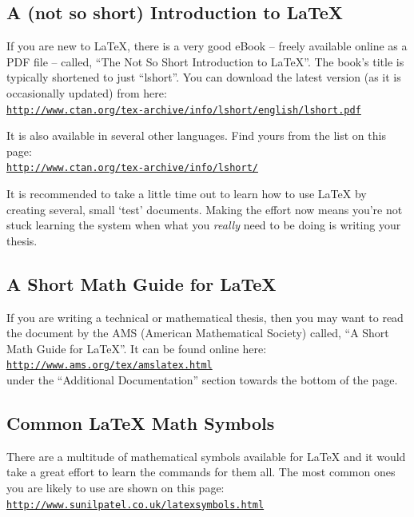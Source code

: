 \subsection{A (not so short) Introduction to \LaTeX{}}

If you are new to \LaTeX{}, there is a very good eBook -- freely available online as a PDF file -- called, ``The Not So Short Introduction to \LaTeX{}''. The book's title is typically shortened to just ``lshort''. You can download the latest version (as it is occasionally updated) from here:\\
\href{http://www.ctan.org/tex-archive/info/lshort/english/lshort.pdf}{\texttt{http://www.ctan.org/tex-archive/info/lshort/english/lshort.pdf}}

It is also available in several other languages. Find yours from the list on this page:\\
\href{http://www.ctan.org/tex-archive/info/lshort/}{\texttt{http://www.ctan.org/tex-archive/info/lshort/}}

It is recommended to take a little time out to learn how to use \LaTeX{} by creating several, small `test' documents. Making the effort now means you're not stuck learning the system when what you \emph{really} need to be doing is writing your thesis.

\subsection{A Short Math Guide for \LaTeX{}}

If you are writing a technical or mathematical thesis, then you may want to read the document by the AMS (American Mathematical Society) called, ``A Short Math Guide for \LaTeX{}''. It can be found online here:\\
\href{http://www.ams.org/tex/amslatex.html}{\texttt{http://www.ams.org/tex/amslatex.html}}\\
under the ``Additional Documentation'' section towards the bottom of the page.

\subsection{Common \LaTeX{} Math Symbols}
There are a multitude of mathematical symbols available for \LaTeX{} and it would take a great effort to learn the commands for them all. The most common ones you are likely to use are shown on this page:\\
\href{http://www.sunilpatel.co.uk/latexsymbols.html}{\texttt{http://www.sunilpatel.co.uk/latexsymbols.html}}

